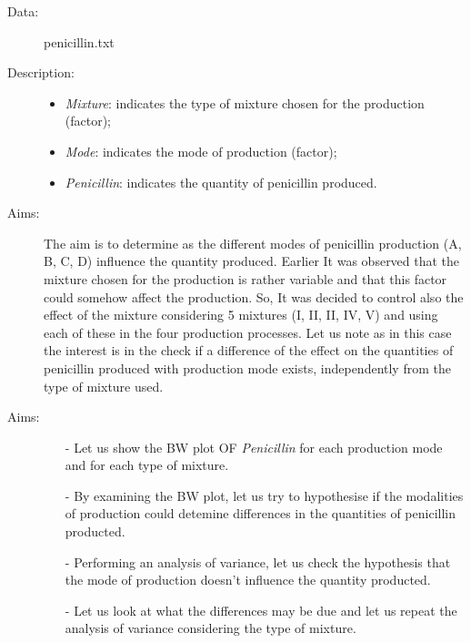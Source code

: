 \begin{frame}
  \begin{description}
    \item[Data: ]penicillin.txt \\ 
    \item[Description: ]
      \begin{footnotesize}
        \begin{itemize}
          \item \textit{Mixture}: indicates the type of mixture chosen for the production (factor);
          \item \textit{Mode}: indicates the mode of production (factor);
          \item \textit{Penicillin}: indicates the quantity of penicillin produced.
        \end{itemize}
      \end{footnotesize}
    \item[Aims: ]
      \begin{footnotesize}
        The aim is to determine as the different modes of penicillin production (A, B, C, D) influence the quantity produced. Earlier It was observed that the mixture chosen for the production is rather variable and that this factor could somehow affect the production. So, It was decided to control also the effect of the mixture considering 5 mixtures (I, II, II, IV, V)  and using each of these in the four production processes. Let us note as in this case the interest is in the check if a difference of the effect on the quantities of penicillin produced with production mode exists, independently from the type of mixture used. 
      \end{footnotesize}
  \end{description}
\end{frame}

\begin{frame}
  \begin{description}
    \item[Aims: ]
      \begin{footnotesize}
        \begin{itemize}
          \item[-] Let us show the BW plot OF \textit{Penicillin} for each production mode and for each type of mixture.
          \item[-] By examining the BW plot, let us try to hypothesise if the modalities of production could detemine differences in the quantities of penicillin producted.
          \item[-] Performing an analysis of variance, let us check the hypothesis that the mode of production doesn't influence the quantity producted.
          \item[-] Let us look at what the differences may be due and let us repeat the analysis of variance considering the type of mixture.
        \end{itemize}
      \end{footnotesize}
  \end{description}
\end{frame}

